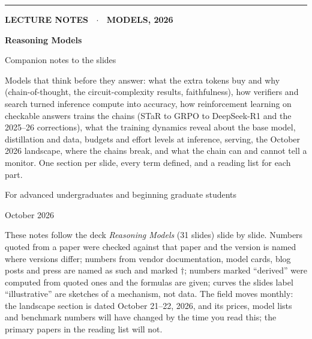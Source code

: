 \documentclass[11pt,letterpaper]{article}
\begin{document}
\begin{titlepage}
\thispagestyle{empty}
\vspace*{2.5cm}
{\color{attn}\rule{3cm}{3pt}}\par\vspace{0.6cm}
{\sffamily\bfseries\color{muted}\large LECTURE NOTES \ $\cdot$ \ MODELS, 2026\par}
\vspace{0.4cm}
{\sffamily\bfseries\fontsize{34}{38}\selectfont\color{ink} Reasoning Models\par}
\vspace{0.3cm}
{\sffamily\fontsize{18}{22}\selectfont\color{ink} Companion notes to the slides\par}
\vspace{1.2cm}
{\large\color{muted}\parbox{0.82\textwidth}{Models that think before they answer: what the extra tokens buy and why (chain-of-thought, the circuit-complexity results, faithfulness), how verifiers and search turned inference compute into accuracy, how reinforcement learning on checkable answers trains the chains (STaR to GRPO to DeepSeek-R1 and the 2025--26 corrections), what the training dynamics reveal about the base model, distillation and data, budgets and effort levels at inference, serving, the October 2026 landscape, where the chains break, and what the chain can and cannot tell a monitor. One section per slide, every term defined, and a reading list for each part.}\par}
\vspace{1.5cm}
{\color{muted}For advanced undergraduates and beginning graduate students\par}
\vspace{0.3cm}
{\color{muted}October 2026\par}
\vfill
{\small\color{muted}\parbox{0.9\textwidth}{These notes follow the deck \textit{Reasoning Models} (31 slides) slide by slide. Numbers quoted from a paper were checked against that paper and the version is named where versions differ; numbers from vendor documentation, model cards, blog posts and press are named as such and marked $\dagger$; numbers marked ``derived'' were computed from quoted ones and the formulas are given; curves the slides label ``illustrative'' are sketches of a mechanism, not data. The field moves monthly: the landscape section is dated October 21--22, 2026, and its prices, model lists and benchmark numbers will have changed by the time you read this; the primary papers in the reading list will not.}\par}
\end{titlepage}
\end{document}
